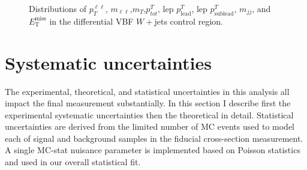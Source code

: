 \begin{figure}[!h]
{  }\hfill
  \hfill
  \hfill
{\caption{Distributions of $p_T^{\ell\ell}$, $m_{\ell\ell}$,$m_T$,$p^T_{tot}$, lep $p^T_{\text{lead}}$, lep $p^T_{\text{sublead}}$, $m_{jj}$, and $\ensuremath{E_{\text{T}}^{\text{miss}}}$ in the differential VBF $W+$jets control region.
\label{fig:WCR}}}
\end{figure}  

\section{Systematic uncertainties}
The experimental, theoretical, and statistical uncertainties in this analysis all impact the final measurement substantially. In this section I describe first the experimental systematic uncertainties then the theoretical in detail. Statistical uncertainties are derived from the limited number of MC events used to model each of signal and background samples in the fiducial cross-section measurement. A single MC-stat nuisance parameter is implemented based on Poisson statistics and used in our overall statistical fit. 

